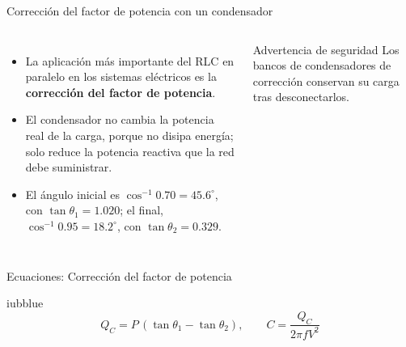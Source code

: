 \documentclass[aspectratio=169,11pt,xcolor={table}]{beamer}
\begin{document}
\begin{frame}{{\normalsize Corrección del factor de potencia con un condensador}}
\begin{columns}[c,onlytextwidth]
\small
\begin{itemize}\setlength{\itemsep}{4pt}
  \item La aplicación más importante del RLC en paralelo en los sistemas eléctricos es la \textbf{corrección del factor de potencia}.
  \item El condensador no cambia la potencia real de la carga, porque no disipa energía; solo reduce la potencia reactiva que la red debe suministrar.
  \item El ángulo inicial es $\cos^{-1}0.70 = 45.6^\circ$, con $\tan\theta_1 = 1.020$; el final, $\cos^{-1}0.95 = 18.2^\circ$, con $\tan\theta_2 = 0.329$.
\end{itemize}
\begin{cardO}{Advertencia de seguridad}
\footnotesize Los bancos de condensadores de corrección conservan su carga tras desconectarlos.
\end{cardO}
\end{columns}
\end{frame}

\begin{frame}{Ecuaciones: Corrección del factor de potencia}
\begin{cajaplana}{iubblue}
\centering
{\large
\begin{equation*}
  Q_C = P\,(\tan\theta_1 - \tan\theta_2), \qquad C = \frac{Q_C}{2\pi f V^{2}}
\end{equation*}
}
\end{cajaplana}
\end{frame}
\end{document}
